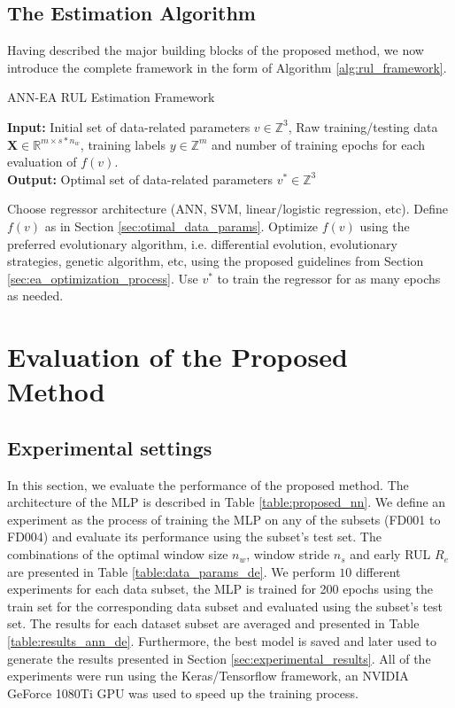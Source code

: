 \documentclass[preprint,12pt]{elsarticle}%
\begin{document}
\subsection{The Estimation Algorithm}

Having described the major building blocks of the proposed method, we now
introduce the complete framework in the form of Algorithm \ref{alg:rul_framework}.

\setcounter{algorithm}{0} 
\begin{algorithm}[!htb]
\caption{\newline ANN-EA RUL Estimation Framework}\label{alg:rul_framework}
\textbf{Input:} Initial set of data-related parameters $v \in \mathbb{Z}^3$, 
Raw training/testing data $\mathbf{X} \in \mathbb{R}^{m \times s*n_w} $, training labels $y \in \mathbb{Z}^m$ and number of training epochs for each evaluation of $f(v)$.\\
\textbf{Output:} Optimal set of data-related parameters $v^* \in \mathbb{Z}^3$
\begin{algorithmic}[1]
\State Choose regressor architecture (ANN, SVM, linear/logistic regression, etc).
\State Define $f(v)$ as in Section \ref{sec:otimal_data_params}.
\State Optimize $f(v)$ using the preferred evolutionary algorithm, i.e. 
differential evolution, evolutionary strategies, genetic algorithm, etc, using the proposed 
guidelines from Section \ref{sec:ea_optimization_process}.
\State Use $v^*$ to train the regressor for as many epochs as needed.
\end{algorithmic}
\end{algorithm}


\section{Evaluation of the Proposed Method}

\label{sec:rul_eval}

\subsection{Experimental settings}

In this section, we evaluate the performance of the proposed method. The architecture of the MLP is described in Table \ref{table:proposed_nn}. We define an experiment as the process of training the MLP on any of the subsets (FD001 to FD004) and evaluate its performance using the subset's test set. The combinations of the optimal window size $n_{w}$, window stride $n_{s}$ and early RUL $R_{e}$ are presented in Table \ref{table:data_params_de}. We perform $10$ different experiments for each data subset, the MLP is trained for 200 epochs using the train set for the corresponding data subset and evaluated using the subset's test set. The results for each dataset subset are averaged and presented in Table \ref{table:results_ann_de}. Furthermore, the best model is saved and later used to generate the results presented in Section \ref{sec:experimental_results}. All of the experiments were run using the Keras/Tensorflow framework, an NVIDIA GeForce 1080Ti GPU was used to speed up the training process.
\end{document}
